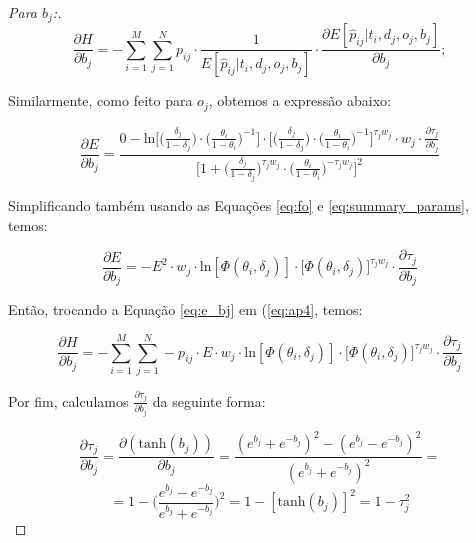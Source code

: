 \begin{proof}[Para $b_j$:]
    \begin{equation}
        \label{eq:ap4}
            \frac{\partial H}{\partial b_j} = - \sum_{i=1}^{M}\sum_{j=1}^{N} p_{ij}\cdot \frac{1}{E[\hat{p}_{ij} | t_i, d_j, o_j, b_j]} \cdot \frac{\partial E[\hat{p}_{ij} | t_i, d_j, o_j, b_j]}{\partial b_j};
    \end{equation}
    
    \noindent Similarmente, como feito para $o_j$, obtemos a expressão abaixo:
    
    \begin{equation}
        \frac{\partial E}{\partial b_j} = \frac{0 - \text{ln}\big[\big(\frac{\delta_j}{ 1 - \delta_j}\big)\cdot \big(\frac{\theta_i}{ 1 - \theta_i}\big)^{-1}\big] \cdot \big[\big(\frac{\delta_j}{ 1 - \delta_j}\big)\cdot \big(\frac{\theta_i}{ 1 - \theta_i}\big)^{-1}\big]^{\tau_j w_j} \cdot w_j \cdot\frac{\partial \tau_j}{\partial b_j}}{\big[ 1 + \big(\frac{\delta_j}{1 - \delta_j}\big)^{\tau_j w_j}\cdot\big(\frac{\theta_i}{1 - \theta_i}\big)^{-\tau_j w_j}\big]^{2}}
    \end{equation}
    
    \noindent Simplificando também usando as Equações \ref{eq:fo} e \ref{eq:summary_params}, temos:
    
    \begin{equation}
        \label{eq:e_bj}    
        \frac{\partial E}{\partial b_j} = - E^{2}\cdot w_j \cdot \text{ln}[\Phi(\theta_i, \delta_j)] \cdot \big[\Phi(\theta_i, \delta_j)]^{\tau_j w_j} \cdot \frac{\partial \tau_j}{\partial b_j}
    \end{equation}
    
    \noindent Então, trocando a Equação \ref{eq:e_bj} em (\ref{eq:ap4}, temos:

    \begin{equation}
            \frac{\partial H}{\partial b_j} = - \sum_{i=1}^{M}\sum_{j=1}^{N} -p_{ij}\cdot E\cdot w_j \cdot \text{ln}[\Phi(\theta_i, \delta_j)] \cdot \big[\Phi(\theta_i, \delta_j)]^{\tau_j w_j} \cdot \frac{\partial \tau_j}{\partial b_j}
    \end{equation}
    
    \noindent Por fim, calculamos $\frac{\partial \tau_j}{\partial b_j}$ da seguinte forma:
    
    \begin{equation}
        \frac{\partial \tau_j}{\partial b_j} = \frac{\partial (\text{tanh}(b_j))}{\partial b_j} = \frac{(e^{b_j} + e^{-b_j})^{2} - (e^{b_j} - e^{-b_j})^{2}}{(e^{b_j} + e^{-b_j})^{2}} =
    \end{equation}
    \begin{equation}
        = 1 - \bigg(\frac{e^{b_j} - e^{-b_j}}{e^{b_j} + e^{-b_j}}\bigg)^{2} = 1 - 
        [\text{tanh}(b_j)]^{2} = 1 - \tau_j^{2}
    \end{equation}
\end{proof}

